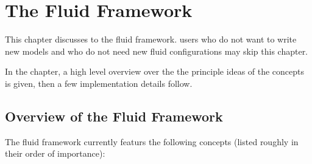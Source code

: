 \chapter{The \Dumux Fluid Framework}
\label{sec:fluidframework}

This chapter discusses to the \Dumux fluid framework. \Dumux users who
do not want to write new models and who do not need new fluid
configurations may skip this chapter.

In the chapter, a high level overview over the the principle ideas of
the concepts is given, then a few implementation details follow.

\section{Overview of the Fluid Framework}

The \Dumux fluid framework currently featurs the following concepts
(listed roughly in their order of importance):

